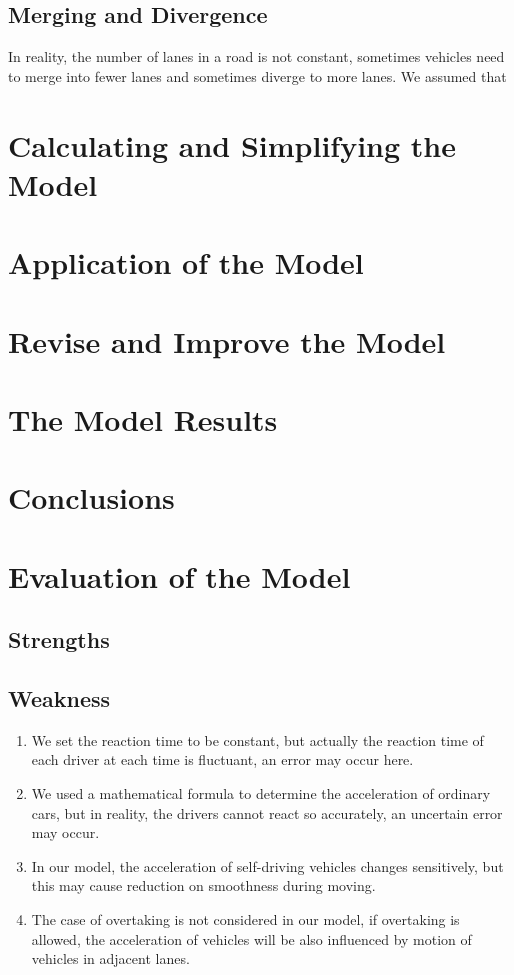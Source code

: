 \documentclass{icmmcm}
\begin{document}
\subsection{Merging and Divergence}
In reality, the number of lanes in a road is not constant, sometimes vehicles need to merge into fewer lanes and sometimes diverge to more lanes. We assumed that 
\section{Calculating and Simplifying the Model}
\section{Application of the Model}%
\section{Revise and Improve the Model}
\section{The Model Results}
\subsection{}
\section{Conclusions}
\section{Evaluation of the Model}
\subsection{Strengths}
\subsection{Weakness}
\begin{enumerate}
\item We set the reaction time to be constant, but actually the reaction time of each driver at each time is fluctuant, an error may occur here.
\item We used a mathematical formula to determine the acceleration of ordinary cars, but in reality, the drivers cannot react so accurately, an uncertain error may occur.
\item In our model, the acceleration of self-driving vehicles changes sensitively, but this may cause reduction on smoothness during moving.
\item The case of overtaking is not considered in our model, if overtaking is allowed, the acceleration of vehicles will be also influenced by motion of vehicles in adjacent lanes. 
\end{enumerate}
\end{document}
